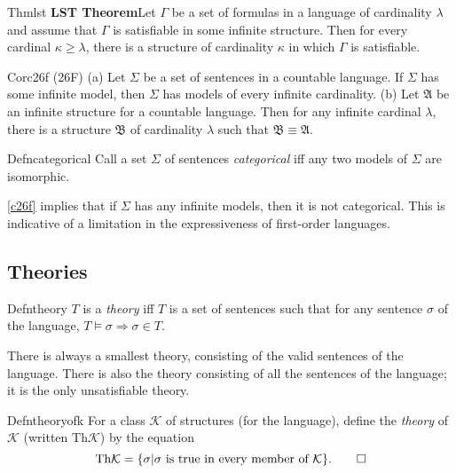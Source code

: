 \begin{reference}{Thm}{lst}
  \textbf{LST Theorem}\quad Let $\Gamma$ be a set of formulas in a language of cardinality $\lambda$ and assume that $\Gamma$ is satisfiable in some infinite structure. Then for every cardinal $\kappa\geq \lambda$, there is a structure of cardinality $\kappa$ in which $\Gamma$ is satisfiable.
\end{reference}


\begin{reference}{Cor}{c26f}
  (26F) (a) Let $\Sigma$ be a set of sentences in a countable language. If $\Sigma$ has some infinite model, then $\Sigma$ has models of every infinite cardinality. (b) Let $\mathfrak{A}$ be an infinite structure for a countable language. Then for any infinite cardinal $\lambda$, there is a structure $\mathfrak{B}$ of cardinality $\lambda$ such that $\mathfrak{B}\equiv \mathfrak{A}$.
\end{reference}

\begin{reference}{Defn}{categorical}
  Call a set $\Sigma$ of sentences \textit{categorical} iff any two models of $\Sigma$ are isomorphic.
\end{reference}

\ref{c26f} implies that if $\Sigma$ has any infinite models, then it is not categorical. This is indicative of a limitation in the expressiveness of first-order languages.


\subsection*{Theories}

\begin{reference}{Defn}{theory}
  $T$ is a \textit{theory} iff $T$ is a set of sentences such that for any sentence $\sigma$ of the language, $T\vDash \sigma\Rightarrow \sigma\in T$.
\end{reference}

There is always a smallest theory, consisting of the valid sentences of the language. There is also the theory consisting of all the sentences of the language; it is the only unsatisfiable theory.

\begin{reference}{Defn}{theoryofk}
  For a class $\mathcal{K}$ of structures (for the language), define the \textit{theory} of $\mathcal{K}$ (written $\mathrm{Th}\mathcal{K}$) by the equation
  \[
    \mathrm{Th}\mathcal{K}=\{\sigma|\sigma\text{ is true in every member of }\mathcal{K}\}.\qedhere
  \]
\end{reference}

